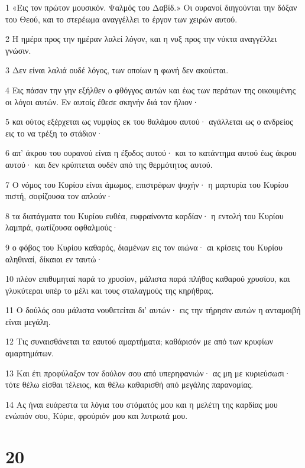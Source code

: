 \par 1 «Εις τον πρώτον μουσικόν. Ψαλμός του Δαβίδ.» Οι ουρανοί διηγούνται την δόξαν του Θεού, και το στερέωμα αναγγέλλει το έργον των χειρών αυτού.
\par 2 Η ημέρα προς την ημέραν λαλεί λόγον, και η νυξ προς την νύκτα αναγγέλλει γνώσιν.
\par 3 Δεν είναι λαλιά ουδέ λόγος, των οποίων η φωνή δεν ακούεται.
\par 4 Εις πάσαν την γην εξήλθεν ο φθόγγος αυτών και έως των περάτων της οικουμένης οι λόγοι αυτών. Εν αυτοίς έθεσε σκηνήν διά τον ήλιον·
\par 5 και ούτος εξέρχεται ως νυμφίος εκ του θαλάμου αυτού· αγάλλεται ως ο ανδρείος εις το να τρέξη το στάδιον·
\par 6 απ' άκρου του ουρανού είναι η έξοδος αυτού· και το κατάντημα αυτού έως άκρου αυτού· και δεν κρύπτεται ουδέν από της θερμότητος αυτού.
\par 7 Ο νόμος του Κυρίου είναι άμωμος, επιστρέφων ψυχήν· η μαρτυρία του Κυρίου πιστή, σοφίζουσα τον απλούν·
\par 8 τα διατάγματα του Κυρίου ευθέα, ευφραίνοντα καρδίαν· η εντολή του Κυρίου λαμπρά, φωτίζουσα οφθαλμούς·
\par 9 ο φόβος του Κυρίου καθαρός, διαμένων εις τον αιώνα· αι κρίσεις του Κυρίου αληθιναί, δίκαιαι εν ταυτώ·
\par 10 πλέον επιθυμηταί παρά το χρυσίον, μάλιστα παρά πλήθος καθαρού χρυσίου, και γλυκύτεραι υπέρ το μέλι και τους σταλαγμούς της κηρήθρας.
\par 11 Ο δούλός σου μάλιστα νουθετείται δι' αυτών· εις την τήρησιν αυτών η ανταμοιβή είναι μεγάλη.
\par 12 Τις συναισθάνεται τα εαυτού αμαρτήματα; καθάρισόν με από των κρυφίων αμαρτημάτων.
\par 13 Και έτι προφύλαξον τον δούλον σου από υπερηφανιών· ας μη με κυριεύσωσι· τότε θέλω είσθαι τέλειος, και θέλω καθαρισθή από μεγάλης παρανομίας.
\par 14 Ας ήναι ευάρεστα τα λόγια του στόματός μου και η μελέτη της καρδίας μου ενώπιόν σου, Κύριε, φρούριόν μου και λυτρωτά μου.

\chapter{20}

